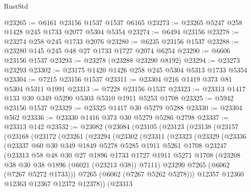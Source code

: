 \begin{lexlean}{RustStd}
\begin{coremodule}
@23265 := @6161 @23156 @1537 @1537 @6165
@23273 := @23265 @5247 @258 @1428 @245 @1733 @2077 @5304 @5354
@23274 := @6494 @23156
@23278 := @23274 @258 @245 @1733 @2076
@23280 := @6235 @23156 @1537
@23288 := @23280 @145 @245 @48 @27 @1733 @1727 @2074 @6254
@23290 := @6606 @23156 @1537
@23293 := @23278 (@23288 @23290 @8192)
@23294 := @23273 @23293
@23302 := @23175 @1420 @1426 @258 @245 @5304 @5313 @1733 @5354
@23304 := @7215 @23156 @1537
@23311 := @23304 @216 @1419 @373 @81 @5304 @5311 @1991
@23313 := @7228 @23156 @1537
@23323 := @23313 @1417 @133 @30 @349 @5290 @5303 @5310 @1911 @5253 @1708
@23325 := @5942 @23156 @1537
@23329 := @23325 @1417 @30 @5279 @5288
@23330 := @23304 @562
@23336 := @23330 @1416 @373 @30 @5279 @5286 @2798
@23337 := @23313 @142
@23532 := @23082
    (@23084
      (@23105
        (@23123
          (@23138
            (@23157
              (@23168
                (@23172
                  (@23261
                    (@23294
                      (@23302
                        (@23311
                          (@23323
                            (@23329
                              (@23336
                                (@23337
                                  @60
                                  @30
                                  @349
                                  @1849
                                  @5278
                                  @5285
                                  @1911
                                  @5261
                                  @1708
                                  @23247
                                  (@23313
                                    @58
                                    @48
                                    @30
                                    @27
                                    @1896
                                    @1733
                                    @1727
                                    @1911
                                    @5271
                                    @1708
                                    (@23208 @38 @30 @38 @1896 (@6021 (@23213 @38)) @7111)
                                    @23290
                                    @7265
                                    (@6062 (@7267 @5272 @1733)))
                                  @7265
                                  (@6062 (@7267 @5262 @5278)))
                                @12357
                                @12360
                                @12363
                                @12367
                                @12372
                                @12378))
                            (@23313

\end{coremodule}
\end{lexlean}
